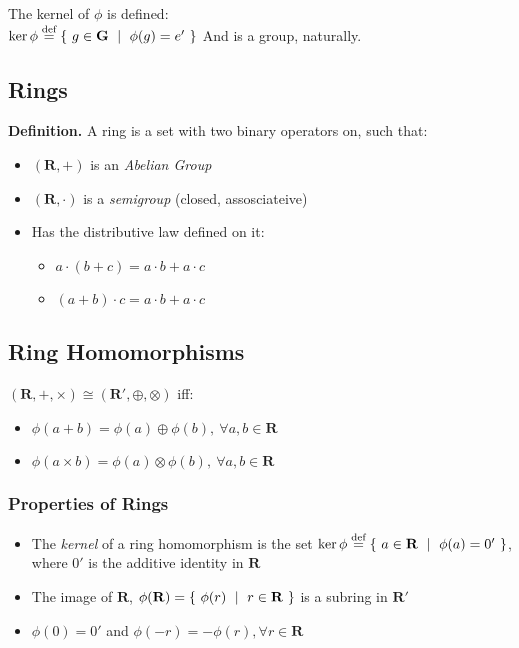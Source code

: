 \documentclass{article}
\begin{document}
  {\noindent}The kernel of $\phi$ is defined:\\
  {\indent}$\ker \phi \stackrel{\text{def}}{=} \{\ g\in\mathbf{G}\ \mid\ \phi(g) = e'\ \}$
  And is a group, naturally.
   

  \subsection{Rings}

  {\noindent}{\bf Definition.} A ring is a set with two binary operators on, such that: \\
  \begin{itemize}
    \item $(\mathbf{R}, +)$ is an \emph{Abelian Group}
    \item $(\mathbf{R}, \cdot)$ is a \emph{semigroup} (closed, assosciateive)
    \item
      Has the distributive law defined on it:
      \begin{itemize}
        \item $a \cdot (b + c) = a \cdot b + a \cdot c$
        \item $(a + b) \cdot c = a \cdot b + a \cdot c$
      \end{itemize}
  \end{itemize}

  \subsection{Ring Homomorphisms}

  {\noindent}$(\mathbf{R}, +, \times) \cong (\mathbf{R}', \oplus, \otimes)$ iff:\\
  \begin{itemize}
    \item
      $\phi(a + b) = \phi(a) \oplus \phi(b),\ \forall a, b \in \mathbf{R}$
    \item
      $\phi(a \times b) = \phi(a) \otimes \phi(b),\ \forall a, b \in \mathbf{R}$
  \end{itemize}

  \subsubsection{Properties of Rings}

  \begin{itemize}

    \item
      The \emph{kernel} of a ring homomorphism is the set
      $\ker \phi \stackrel{\text{def}}{=} \{\ a\in\mathbf{R}\ \mid\ \phi(a)=0'\ \}$, where $0'$ is the
      additive identity in $\mathbf{R}$

    \item
      The image of $\mathbf{R}$, $\phi(\mathbf{R}) = \{\ \phi(r)\ \mid\ r \in \mathbf{R}\ \}$
      is a subring in $\mathbf{R}'$

    \item
      $\phi(0) = 0'$ and $\phi(-r) = -\phi(r), \forall r \in \mathbf{R}$

  \end{itemize}
\end{document}
